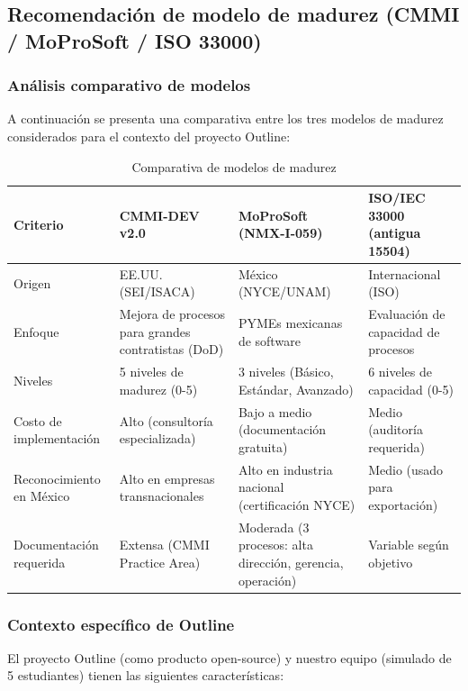\documentclass[12pt]{article}
\begin{document}
\setcounter{section}{1}
\setcounter{subsection}{4}
\subsection{Recomendación de modelo de madurez (CMMI / MoProSoft / ISO 33000)}

\subsubsection{Análisis comparativo de modelos}

A continuación se presenta una comparativa entre los tres modelos de madurez considerados para el contexto del proyecto Outline:

\begin{table}[H]
\centering
\small
\begin{tabularx}{\textwidth}{|l|X|X|X|}
\hline
\textbf{Criterio} & \textbf{CMMI-DEV v2.0} & \textbf{MoProSoft (NMX-I-059)} & \textbf{ISO/IEC 33000 (antigua 15504)} \\
\hline
Origen & EE.UU. (SEI/ISACA) & México (NYCE/UNAM) & Internacional (ISO) \\
\hline
Enfoque & Mejora de procesos para grandes contratistas (DoD) & PYMEs mexicanas de software & Evaluación de capacidad de procesos \\
\hline
Niveles & 5 niveles de madurez (0-5) & 3 niveles (Básico, Estándar, Avanzado) & 6 niveles de capacidad (0-5) \\
\hline
Costo de implementación & Alto (consultoría especializada) & Bajo a medio (documentación gratuita) & Medio (auditoría requerida) \\
\hline
Reconocimiento en México & Alto en empresas transnacionales & Alto en industria nacional (certificación NYCE) & Medio (usado para exportación) \\
\hline
Documentación requerida & Extensa (CMMI Practice Area) & Moderada (3 procesos: alta dirección, gerencia, operación) & Variable según objetivo \\
\hline
\end{tabularx}
\caption{Comparativa de modelos de madurez}
\end{table}

\subsubsection{Contexto específico de Outline}

El proyecto Outline (como producto open-source) y nuestro equipo (simulado de 5 estudiantes) tienen las siguientes características:
\end{document}
